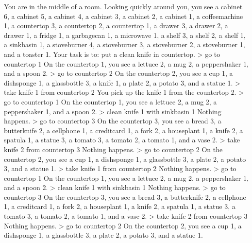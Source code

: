 \documentclass[
]{article}
\newenvironment{Shaded}{}{}
\newcommand{\NormalTok}[1]{#1}
\begin{document}
\begin{Shaded}
\begin{Highlighting}[]
\NormalTok{You are in the middle of a room. Looking quickly around you, you see a cabinet 6, a cabinet 5, a cabinet 4, a cabinet 3, a cabinet 2, a cabinet 1, a coffeemachine 1, a countertop 3, a countertop 2, a countertop 1, a drawer 3, a drawer 2, a drawer 1, a fridge 1, a garbagecan 1, a microwave 1, a shelf 3, a shelf 2, a shelf 1, a sinkbasin 1, a stoveburner 4, a stoveburner 3, a stoveburner 2, a stoveburner 1, and a toaster 1.}
\NormalTok{Your task is to: put a clean knife in countertop.}
\NormalTok{\textgreater{} go to countertop 1}
\NormalTok{On the countertop 1, you see a lettuce 2, a mug 2, a peppershaker 1, and a spoon 2.}
\NormalTok{\textgreater{} go to countertop 2}
\NormalTok{On the countertop 2, you see a cup 1, a dishsponge 1, a glassbottle 3, a knife 1, a plate 2, a potato 3, and a statue 1.}
\NormalTok{\textgreater{} take knife 1 from countertop 2}
\NormalTok{You pick up the knife 1 from the countertop 2.}
\NormalTok{\textgreater{} go to countertop 1}
\NormalTok{On the countertop 1, you see a lettuce 2, a mug 2, a peppershaker 1, and a spoon 2.}
\NormalTok{\textgreater{} clean knife 1 with sinkbasin 1}
\NormalTok{Nothing happens.}
\NormalTok{\textgreater{} go to countertop 3}
\NormalTok{On the countertop 3, you see a bread 3, a butterknife 2, a cellphone 1, a creditcard 1, a fork 2, a houseplant 1, a knife 2, a spatula 1, a statue 3, a tomato 3, a tomato 2, a tomato 1, and a vase 2.}
\NormalTok{\textgreater{} take knife 2 from countertop 3}
\NormalTok{Nothing happens.}
\NormalTok{\textgreater{} go to countertop 2}
\NormalTok{On the countertop 2, you see a cup 1, a dishsponge 1, a glassbottle 3, a plate 2, a potato 3, and a statue 1.}
\NormalTok{\textgreater{} take knife 1 from countertop 2}
\NormalTok{Nothing happens.}
\NormalTok{\textgreater{} go to countertop 1}
\NormalTok{On the countertop 1, you see a lettuce 2, a mug 2, a peppershaker 1, and a spoon 2.}
\NormalTok{\textgreater{} clean knife 1 with sinkbasin 1}
\NormalTok{Nothing happens.}
\NormalTok{\textgreater{} go to countertop 3}
\NormalTok{On the countertop 3, you see a bread 3, a butterknife 2, a cellphone 1, a creditcard 1, a fork 2, a houseplant 1, a knife 2, a spatula 1, a statue 3, a tomato 3, a tomato 2, a tomato 1, and a vase 2.}
\NormalTok{\textgreater{} take knife 2 from countertop 3}
\NormalTok{Nothing happens.}
\NormalTok{\textgreater{} go to countertop 2}
\NormalTok{On the countertop 2, you see a cup 1, a dishsponge 1, a glassbottle 3, a plate 2, a potato 3, and a statue 1.}

\end{Highlighting}
\end{Shaded}
\end{document}
